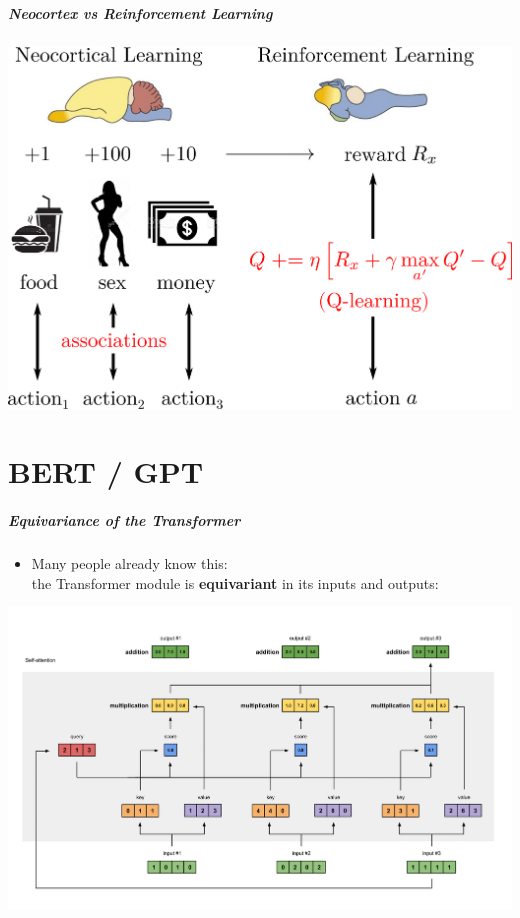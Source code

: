\documentclass[16pt]{beamer}
\begin{document}
\begin{frame}
\frametitle{Neocortex vs Reinforcement Learning}
\centering
\includegraphics[scale=0.5]{neocortex-vs-RL.png}
\end{frame}

\part{BERT / GPT}
\frame{\partpage}

\begin{frame}
\frametitle{Equivariance of the Transformer}
\begin{itemize}
	\item Many people already know this: \\
	the Transformer module is \textbf{equivariant} in its inputs and outputs:
\end{itemize}
\centering
\includegraphics[scale=0.2]{self-attention.png}
\end{frame}
\end{document}
